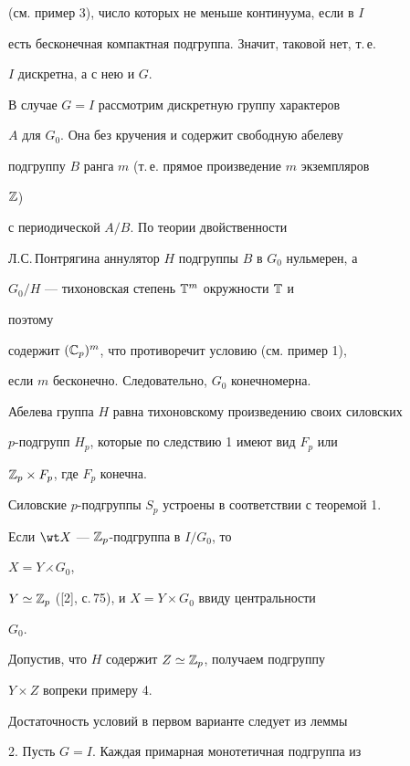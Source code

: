 (см. пример 3), число которых не меньше континуума, если в $I$ 


есть бесконечная компактная подгруппа. Значит, таковой нет, т.\,е.  


$I$ дискретна, а с нею и $G$. 


 


В случае $G=I$ рассмотрим дискретную группу характеров  


$A$ для $G_0$. Она без кручения и содержит свободную абелеву  


подгруппу $B$ ранга $m$ (т.\,е. прямое произведение $m$ экземпляров 


$\Bbb Z$) 


с периодической $A/B$. По теории двойственности  


Л.С.\,Понтрягина аннулятор $H$ подгруппы $B$ в $G_0$ нульмерен, а  


$G_0/H$ --- тихоновская степень $\Bbb T^m$ окружности $\Bbb T$ и 


поэтому 


содержит $(\Bbb C_p)^m$, что противоречит условию (см. пример 1), 


если $m$ бесконечно. Следовательно, $G_0$ конечномерна.  


Абелева группа $H$ равна тихоновскому произведению своих силовских 


$p$-подгрупп $H_p$, которые по следствию 1 имеют вид $F_p$ или  


$\Bbb Z_p\times F_p$, где $F_p$ конечна. 


 


Силовские $p$-подгруппы $S_p$ устроены в соответствии с теоремой 1. 


Если $\wt X$ --- $\Bbb Z_p$-подгруппа в $I/G_0$, то 


$X=Y\rightthreetimes G_0$, 


$Y\simeq\Bbb Z_p$ ([2], с.\,75), и $X=Y\times G_0$ ввиду центральности 


$G_0$. 


Допустив, что $H$ содержит $Z\simeq\Bbb Z_p$, получаем подгруппу 


$Y\times Z$ вопреки примеру 4. 


 


Достаточность условий в первом варианте следует из леммы 


2. Пусть $G=I$. Каждая примарная монотетичная подгруппа из 


